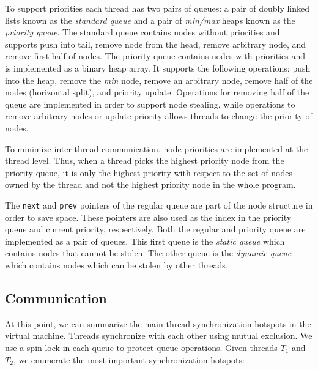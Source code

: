 To support priorities each thread has two pairs of queues: a pair of
doubly linked lists known as the \emph{standard queue} and a pair of
\emph{min/max} heaps known as the \emph{priority queue}.  The standard queue
contains nodes without priorities and supports push into tail, remove
node from the head, remove arbitrary node, and remove first half of
nodes.  The priority queue contains nodes with priorities and is
implemented as a binary heap array. It supports the following
operations: push into the heap, remove the \emph{min} node, remove an
arbitrary node, remove half of the nodes (horizontal split), and
priority update.  Operations for removing half of the queue are
implemented in order to support node stealing, while operations to
remove arbitrary nodes or update priority allows threads
to change the priority of nodes.

To minimize inter-thread communication, node priorities are
implemented at the thread level. Thus, when a thread picks the highest
priority node from the priority queue, it is only the highest priority
with respect to the set of nodes owned by the thread and not the
highest priority node in the whole program.  

The \texttt{next} and \texttt{prev} pointers of the regular queue are
part of the node structure in order to save space. These pointers are
also used as the index in the priority queue and current priority,
respectively. Both the regular and priority queue are implemented as a pair of
queues.  This first queue is the \emph{static queue} which
contains nodes that cannot be stolen.  The other queue is
the \emph{dynamic queue} which contains nodes which can be stolen by
other threads.

\subsection{Communication}

At this point, we can summarize the main thread synchronization hotspots in the
virtual machine. Threads synchronize with each other using mutual exclusion. We
use a spin-lock in each queue to protect queue operations.  Given threads $T_1$
and $T_2$, we enumerate the most important synchronization hotspots:

